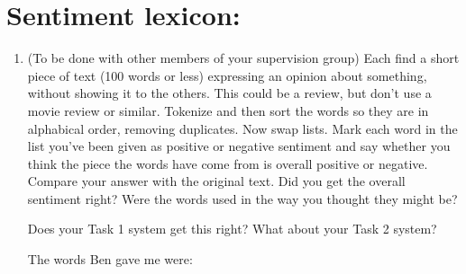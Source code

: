 \documentclass[10pt,\jkfside,a4paper]{article}
\begin{document}
\section{Sentiment lexicon:}

\begin{enumerate}

\item (To be done with other members of your supervision group) Each find
a short piece of text (100 words or less) expressing an opinion about
something, without showing it to the others. This could be a review, but
don’t use a movie review or similar. Tokenize and then sort the words so
they are in alphabical order, removing duplicates. Now swap lists. Mark
each word in the list you’ve been given as positive or negative sentiment
and say whether you think the piece the words have come from is overall
positive or negative. Compare your answer with the original text. Did
you get the overall sentiment right? Were the words used in the way you
thought they might be?

Does your Task 1 system get this right? What about your Task 2 system?

The words Ben gave me were:


\end{enumerate}
\end{document}
